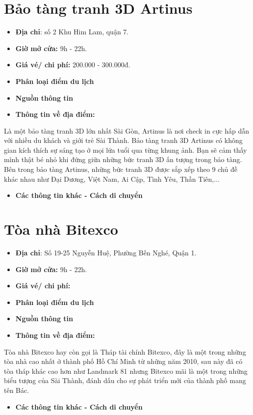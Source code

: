 \documentclass{article}
\begin{document}
\section{Bảo tàng tranh 3D Artinus}
\begin{itemize}
    \item{\textbf{Địa chỉ}: số 2 Khu Him Lam, quận 7.}
    \item{\textbf{Giờ mở cửa:} 9h - 22h.}
    \item{\textbf{Giá vé/ chi phí:} 200.000 - 300.000đ.}
    \item{\textbf{Phân loại điểm du lịch} }
    \item{\textbf{Nguồn thông tin}}
    \item{\textbf{Thông tin về địa điểm:}}
\end{itemize}
Là một bảo tàng tranh 3D lớn nhất Sài Gòn, Artinus là nơi check in cực hấp dẫn với nhiều du khách và giới trẻ Sài Thành. Bảo tàng tranh 3D Artinus có không gian kích thích sự sáng tạo ở mọi lứa tuổi qua từng khung ảnh. Bạn sẽ cảm thấy mình thật bé nhỏ khi đứng giữa những bức tranh 3D ấn tượng trong bảo tàng. Bên trong bảo tàng Artinus, những bức tranh 3D được sắp xếp theo 9 chủ đề khác nhau như Đại Dương, Việt Nam, Ai Cập, Tình Yêu, Thần Tiên,...
\begin{itemize}
    \item{\textbf{Các thông tin khác - Cách di chuyển}}
\end{itemize}

\section{Tòa nhà Bitexco}
\begin{itemize}
    \item{\textbf{Địa chỉ}: Số 19-25 Nguyễn Huệ, Phường Bến Nghé, Quận 1.}
    \item{\textbf{Giờ mở cửa:} 9h - 22h.}
    \item{\textbf{Giá vé/ chi phí:}}
    \item{\textbf{Phân loại điểm du lịch} }
    \item{\textbf{Nguồn thông tin}}
    \item{\textbf{Thông tin về địa điểm:}}
\end{itemize}
Tòa nhà Bitexco hay còn gọi là Tháp tài chính Bitexco, đây là một trong những tòa nhà cao nhất ở thành phố Hồ Chí Minh từ những năm 2010, sau này đã có tòa tháp khác cao hơn như Landmark 81 nhưng Bitexco mãi là một trong những biểu tượng của Sài Thành, đánh dấu cho sự phát triển mới của thành phố mang tên Bác.
\begin{itemize}
    \item{\textbf{Các thông tin khác - Cách di chuyển}}
\end{itemize}
\end{document}
